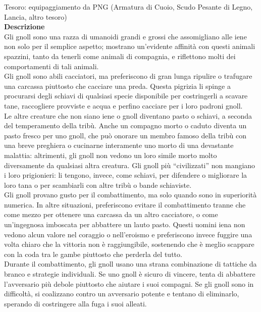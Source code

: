 \begin{multicols}{2}
Tesoro: equipaggiamento da PNG (Armatura di Cuoio, Scudo Pesante di Legno, Lancia, altro tesoro)\\
\textbf{Descrizione}\\
Gli gnoll sono una razza di umanoidi grandi e grossi che assomigliano alle iene non solo per il semplice aspetto; mostrano un’evidente affinità con questi animali spazzini, tanto da tenerli come animali di compagnia, e riflettono molti dei comportamenti di tali animali.\\

Gli gnoll sono abili cacciatori, ma preferiscono di gran lunga ripulire o trafugare una carcassa piuttosto che cacciare una preda. Questa pigrizia li spinge a procurarsi degli schiavi di qualsiasi specie disponibile per costringerli a scavare tane, raccogliere provviste e acqua e perfino cacciare per i loro padroni gnoll.\\

Le altre creature che non siano iene o gnoll diventano pasto o schiavi, a seconda del temperamento della tribù. Anche un compagno morto o caduto diventa un pasto fresco per uno gnoll, che può onorare un membro famoso della tribù con una breve preghiera o cucinarne interamente uno morto di una devastante malattia: altrimenti, gli gnoll non vedono un loro simile morto molto diversamente da qualsiasi altra creatura. Gli gnoll più “civilizzati” non mangiano i loro prigionieri: li tengono, invece, come schiavi, per difendere o migliorare la loro tana o per scambiarli con altre tribù o bande schiaviste.\\

Gli gnoll provano gusto per il combattimento, ma solo quando sono in superiorità numerica. In altre situazioni, preferiscono evitare il combattimento tranne che come mezzo per ottenere una carcassa da un altro cacciatore, o come un’ingegnosa imboscata per abbattere un lauto pasto. Questi uomini iena non vedono alcun valore nel coraggio o nell'eroismo e preferiscono invece fuggire una volta chiaro che la vittoria non è raggiungibile, sostenendo che è meglio scappare con la coda tra le gambe piuttosto che perderla del tutto.\\

Durante il combattimento, gli gnoll usano una strana combinazione di tattiche da branco e strategie individuali. Se uno gnoll è sicuro di vincere, tenta di abbattere l'avversario più debole piuttosto che aiutare i suoi compagni. Se gli gnoll sono in difficoltà, si coalizzano contro un avversario potente e tentano di eliminarlo, sperando di costringere alla fuga i suoi alleati.\\


\end{multicols}
